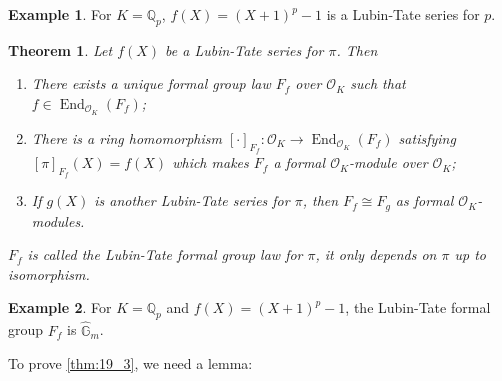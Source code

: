 \documentclass[11pt]{article}
\theoremstyle{definition}
\newtheorem*{example}{Example}
\theoremstyle{plain}
\newtheorem{theorem}[definition]{Theorem}
\theoremstyle{remark}
\DeclareMathOperator{\End}{End}
\newcommand{\QQ}{\mathbb{Q}}
\newcommand{\cO}{\mathcal{O}}
\newcommand{\Ghat}{\widehat{\mathbb{G}}}
\begin{document}
\begin{example}
    For $K = \QQ_p$, $f(X) = (X+1)^p-1$ is a Lubin-Tate series for $p$.
\end{example}

\begin{theorem}\label{thm:19_3}
    Let $f(X)$ be a Lubin-Tate series for $\pi$. Then
    \begin{enumerate}
        \item There exists a unique formal group law $F_f$ over $\cO_K$ such that $f \in \End_{\cO_K}(F_f)$;
        \item There is a ring homomorphism $[\cdot]_{F_f} : \cO_K \to \End_{\cO_K}(F_f)$ satisfying $[\pi]_{F_f}(X) = f(X)$ which makes $F_f$ a formal $\cO_K$-module over $\cO_K$;
        \item If $g(X)$ is another Lubin-Tate series for $\pi$, then $F_f \cong F_g$ as formal $\cO_K$-modules.
    \end{enumerate}
    $F_f$ is called the \emph{Lubin-Tate formal group law} for $\pi$, it only depends on $\pi$ up to isomorphism.
\end{theorem}

\begin{example}
    For $K = \QQ_p$ and $f(X) = (X+1)^p - 1$, the Lubin-Tate formal group $F_f$ is $\Ghat_m$.
\end{example}

\noindent To prove \autoref{thm:19_3}, we need a lemma:
\end{document}
